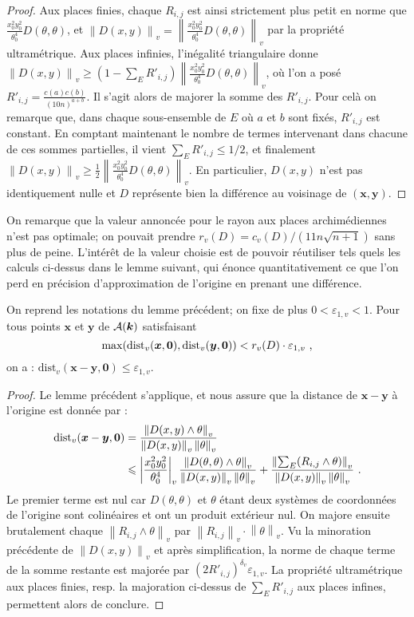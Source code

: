 \documentclass[11pt, twoside, a4paper, french]{article}
\numberwithin{equation}{section}
\renewcommand{\ge}{\geqslant} \renewcommand{\le}{\leqslant}
\newcommand{\eps}{\varepsilon} \newcommand{\truc}{\,\cdot\,}
\newcommand{\av}[2][v]{\left\lvert#2\right\rvert_{#1}} 		%
\newcommand{\nv}[2][v]{\left\lVert#2\right\rVert_{#1}} 		%
\newcommand{\dv}{{\delta_v}} 					%
\newcommand{\Dv}{\mathrm{dist}_v} 				%
\newcommand{\A}{\mathcal{A}} 					%
\newcommand{\p}[1]{{\boldsymbol{#1}}} 				%
\newcommand{\OA}{\p{0}} 					%
\newcommand{\coa}{\theta} 					%
\begin{document}
\begin{proof}
Aux places finies, chaque $R_{i, j}$ est ainsi strictement plus petit en norme que $\frac{x_0^2y_0^2}{\coa_0^4}D(\coa, \coa)$, et $\nv{D(x, y)} = \nv{\frac{x_0^2y_0^2}{\coa_0^4}D(\coa, \coa)}$ par la propriété ultramétrique. Aux places infinies, l'inégalité triangulaire donne $\nv{D(x, y)} \ge (1-\sum_E R'_{i, j}) \nv{\frac{x_0^2y_0^2}{\coa_0^4}D(\coa, \coa)}$, où l'on a posé $R'_{i, j} = \frac{c(a)c(b)}{ \left( 10n \right)^{a+b}}$. Il s'agit alors de majorer la somme des $R'_{i, j}$. Pour celà on remarque que, dans chaque sous-ensemble de $E$ où $a$ et $b$ sont fixés, $R'_{i, j}$ est constant. En comptant maintenant le nombre de termes intervenant dans chacune de ces sommes partielles, il vient $\sum_E R'_{i, j} \le 1/2$, et finalement $\nv{D(x, y)} \ge \frac{1}{2} \nv{\frac{x_0^2y_0^2}{\coa_0^4}D(\coa, \coa)}$. En particulier, $D(x, y)$ n'est pas identiquement nulle et $D$ représente bien la différence au voisinage de $(\p{x}, \p{y})$.
\end{proof}

On remarque que la valeur annoncée pour le rayon aux places archimédiennes n'est pas optimale; on pouvait prendre $r_v(D) = c_v(D)/(11n\sqrt{n+1})$ sans plus de peine. L'intérêt de la valeur choisie est de pouvoir réutiliser tels quels les calculs ci-dessus dans le lemme suivant, qui énonce quantitativement ce que l'on perd en précision d'approximation de l'origine en prenant une différence.

\begin{lem} \label{DistRel}
On reprend les notations du lemme précédent; on fixe de plus $0 < \eps_{1, v} < 1$. Pour tous points $\p{x}$ et $\p{y}$ de $\A(\cdn)$ satisfaisant
\[ \max ( \Dv(\p{x}, \OA), \Dv(\p{y}, \OA) ) < r_v(D) \cdot \eps_{1,v} \pmm{,} \]
on a : $\Dv(\p{x}-\p{y}, \OA) \le \eps_{1,v}$.
\end{lem}


\begin{proof}
Le lemme précédent s'applique, et nous assure que la distance de $\p{x}-\p{y}$ à l'origine  est donnée par :
\begin{align*}
\Dv(\p{x}-\p{y}, \OA) & = \frac{\nv{D(x, y) \wedge \coa}}{\nv{D(x, y)}\nv{\coa}} \\
& \le \av{\frac{x_0^2y_0^2}{\coa_0^4}}\frac{\nv{D(\coa, \coa)\wedge \coa}}{\nv{D(x, y)}\nv{\coa}} + \frac{\nv{\sum_E (R_{i, j} \wedge \coa)}}{\nv{D(x, y)}\nv{\coa}} \pmm{.}
\end{align*}
Le premier terme est nul car $D(\coa, \coa)$ et $\coa$ étant deux systèmes de coordonnées de l'origine sont colinéaires et ont un produit extérieur nul. On majore ensuite brutalement chaque $\nv{R_{i, j} \wedge \coa}$ par $\nv{R_{i, j}} \cdot \nv{\coa}$. Vu la minoration précédente de $\nv{D(x, y)}$ et après simplification, la norme de chaque terme de la somme restante est majorée par $(2R'_{i, j})^\dv \eps_{1, v}$. La propriété ultramétrique aux places finies, resp. la majoration ci-dessus de $\sum_E R'_{i, j}$ aux places infines, permettent alors de conclure.
\end{proof}
\end{document}
